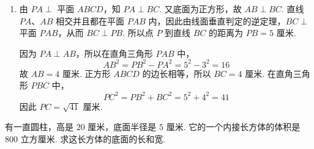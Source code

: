 \begin{solution}
\begin{enumerate}
解法二：由 \(OD=6\text{ 毫米}\)、\(CD=9\text{ 毫米}\)，且图中 \(C\) 在 \(O\) 与 \(E\) 的同一直线上，得
\[
OC=CD-OD=9-6=3\text{ 毫米}
\]
连接 \(OA\). 因为 \(OC\perp AB\)，且 \(C\) 是弦 \(AB\) 的中点，所以 \(AC=\frac{x}{2}\text{ 毫米}\). 在直角三角形 \(OAC\) 中，
\(OA^2=OC^2+AC^2\)，\(6^2=3^2+\left(\frac{x}{2}\right)^2\).
因此 \(\frac{x^2}{4}=27\)，长度取正值得 \(x=6\sqrt3\text{ 毫米}\). 答：小孔的直径是 \(6\sqrt3\text{ 毫米}\).

\item
由 \(PA\perp\) 平面 \(ABCD\)，知 \(PA\perp BC\). 又底面为正方形，故 \(AB\perp BC\). 直线 \(PA\)、\(AB\) 相交并且都在平面 \(PAB\) 内，因此由线面垂直判定的逆定理，\(BC\perp\) 平面 \(PAB\)，从而 \(BC\perp PB\). 所以点 \(P\) 到直线 \(BC\) 的距离为 \(PB=5\text{ 厘米}\).

因为 \(PA\perp AB\)，所以在直角三角形 \(PAB\) 中，
\[
AB^2=PB^2-PA^2=5^2-3^2=16
\]
故 \(AB=4\text{ 厘米}\). 正方形 \(ABCD\) 的边长相等，所以 \(BC=4\text{ 厘米}\). 在直角三角形 \(PBC\) 中，
\[
PC^2=PB^2+BC^2=5^2+4^2=41
\]
因此 \(PC=\sqrt{41}\text{ 厘米}\).
\end{enumerate}
\end{solution}

\begin{problem}
有一直圆柱，高是 \(20\text{ 厘米}\)，底面半径是 \(5\text{ 厘米}\). 它的一个内接长方体的体积是 \(800\text{ 立方厘米}\). 求这长方体的底面的长和宽.
\end{problem}

